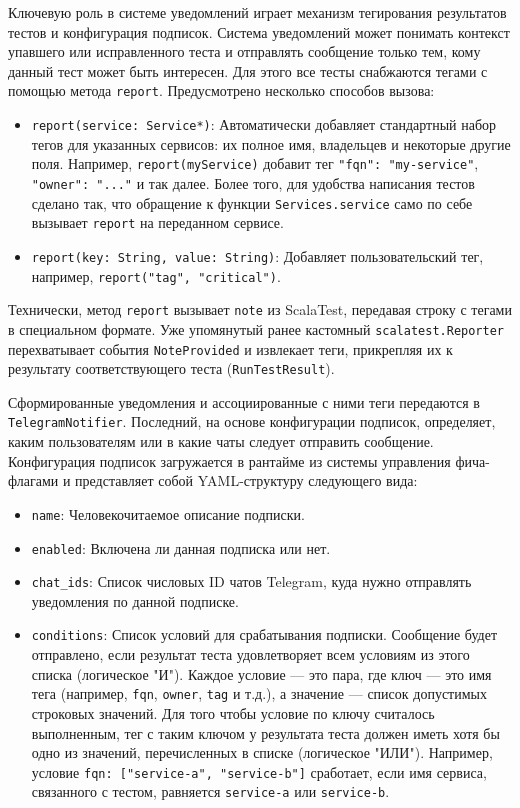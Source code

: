 Ключевую роль в системе уведомлений играет механизм тегирования результатов тестов и конфигурация подписок.
Система уведомлений может понимать контекст упавшего или исправленного теста и отправлять сообщение только тем, кому данный тест может быть интересен. Для этого все тесты снабжаются тегами с помощью метода \verb|report|. Предусмотрено несколько способов вызова:
\begin{itemize}
    \item \verb|report(service: Service*)|: Автоматически добавляет стандартный набор тегов для указанных сервисов: их полное имя, владельцев и некоторые другие поля. Например, \verb|report(myService)| добавит тег \verb|"fqn": "my-service"|, \verb|"owner": "..."| и так далее. Более того, для удобства написания тестов сделано так, что обращение к функции \verb|Services.service| само по себе вызывает \verb|report| на переданном сервисе.
    \item \verb|report(key: String, value: String)|: Добавляет пользовательский тег, например, \verb|report("tag", "critical")|.
\end{itemize}

Технически, метод \verb|report| вызывает \verb|note| из ScalaTest, передавая строку с тегами в специальном формате. Уже упомянутый ранее кастомный \verb|scalatest.Reporter| перехватывает события \verb|NoteProvided| и извлекает теги, прикрепляя их к результату соответствующего теста (\verb|RunTestResult|).

Сформированные уведомления и ассоциированные с ними теги передаются в \verb|TelegramNotifier|. Последний, на основе конфигурации подписок, определяет, каким пользователям или в какие чаты следует отправить сообщение. Конфигурация подписок загружается в рантайме из системы управления фича-флагами и представляет собой YAML-структуру следующего вида:

\begin{itemize}
    \item \verb|name|: Человекочитаемое описание подписки.
    \item \verb|enabled|: Включена ли данная подписка или нет.
    \item \verb|chat_ids|: Список числовых ID чатов Telegram, куда нужно отправлять уведомления по данной подписке.
    \item \verb|conditions|: Список условий для срабатывания подписки. Сообщение будет отправлено, если результат теста удовлетворяет всем условиям из этого списка (логическое "И"). Каждое условие — это пара, где ключ — это имя тега (например, \verb|fqn|, \verb|owner|, \verb|tag| и т.д.), а значение — список допустимых строковых значений. Для того чтобы условие по ключу считалось выполненным, тег с таким ключом у результата теста должен иметь хотя бы одно из значений, перечисленных в списке (логическое "ИЛИ"). Например, условие \verb|fqn: ["service-a", "service-b"]| сработает, если имя сервиса, связанного с тестом, равняется \verb|service-a| или \verb|service-b|.
\end{itemize}

